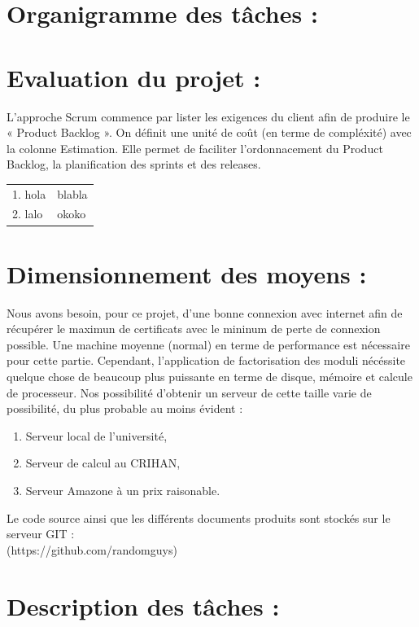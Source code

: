 \documentclass[a4paper,11pt,french]{article}
\begin{document}
\section{Organigramme des tâches :}

\newpage

\section{Evaluation du projet :}

L'approche Scrum commence par lister les exigences du client afin de produire le « Product Backlog ». On définit une unité de coût (en terme de compléxité) avec la colonne Estimation. Elle permet de faciliter l'ordonnacement du Product Backlog, la planification des sprints et des releases.

\begin{tabular}{ll}
1. hola & blabla\\
2. lalo & okoko\\
\end{tabular}


\section{Dimensionnement des moyens :}

Nous avons besoin, pour ce projet, d'une bonne connexion avec internet afin de récupérer le maximun de certificats avec le mininum de perte de connexion possible. Une machine moyenne (normal) en terme de performance est nécessaire pour cette partie. Cependant, l'application de factorisation des moduli nécéssite quelque chose de beaucoup plus puissante en terme de disque, mémoire et calcule de processeur. Nos possibilité d'obtenir un serveur de cette taille varie de possibilité, du plus probable au moins évident :
\begin{enumerate}
\item Serveur local de l'université,
\item Serveur de calcul au CRIHAN,
\item Serveur Amazone à un prix raisonable.
\end{enumerate}

Le code source ainsi que les différents documents produits sont stockés sur le serveur GIT : \\ (https://github.com/randomguys)

\newpage

\section{Description des tâches :}
\end{document}
